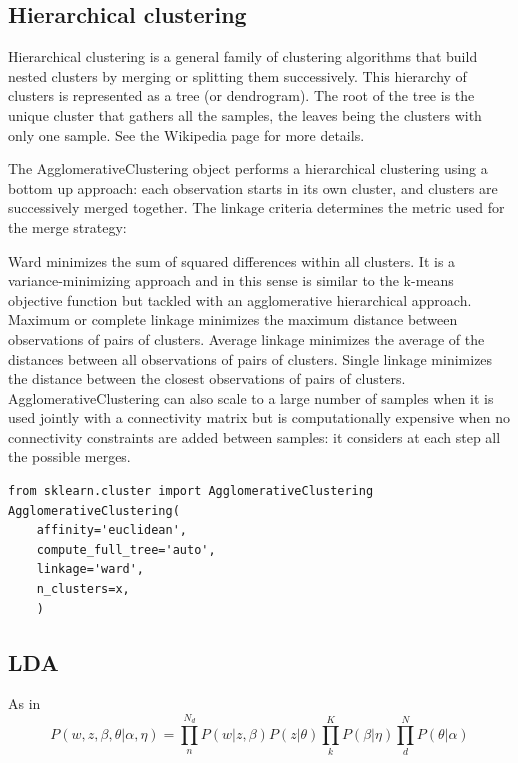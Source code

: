 \subsection{Hierarchical clustering}

Hierarchical clustering is a general family of clustering algorithms that build nested clusters by merging or splitting them successively. This hierarchy of clusters is represented as a tree (or dendrogram). The root of the tree is the unique cluster that gathers all the samples, the leaves being the clusters with only one sample. See the Wikipedia page for more details.

The AgglomerativeClustering object performs a hierarchical clustering using a bottom up approach: each observation starts in its own cluster, and clusters are successively merged together. The linkage criteria determines the metric used for the merge strategy:

Ward minimizes the sum of squared differences within all clusters. It is a variance-minimizing approach and in this sense is similar to the k-means objective function but tackled with an agglomerative hierarchical approach.
Maximum or complete linkage minimizes the maximum distance between observations of pairs of clusters.
Average linkage minimizes the average of the distances between all observations of pairs of clusters.
Single linkage minimizes the distance between the closest observations of pairs of clusters.
AgglomerativeClustering can also scale to a large number of samples when it is used jointly with a connectivity matrix but is computationally expensive when no connectivity constraints are added between samples: it considers at each step all the possible merges.
\begin{lstlisting}[style=mypython]
from sklearn.cluster import AgglomerativeClustering
AgglomerativeClustering(
    affinity='euclidean',
    compute_full_tree='auto',
    linkage='ward',
    n_clusters=x,
    )
\end{lstlisting}

\subsection{LDA}\label{sec:lda}
As in ~\cite{Zhou2016}
\begin{equation}\label{eq:lda}
P(w, z,\beta, \theta| \alpha, \eta)=\prod_n^{N_d} P(w|z,\beta)P(z|\theta)\prod_k^KP(\beta|\eta)\prod_d^N P(\theta | \alpha)
\end{equation}

